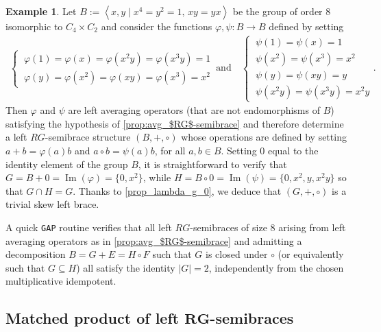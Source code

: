 \documentclass[11pt]{amsart}
\newcommand\Imm{\operatorname{Im}}
\theoremstyle{definition}
\newtheorem{Ex}[theorem]{Example}
\begin{document}
\begin{Ex}
    Let $B := \left\langle x,y \mid x^4 = y^2 = 1,\, xy = yx \right\rangle$ be the group of order $8$ isomorphic to $C_4 \times C_2$ and consider the functions $\varphi,\psi:B \to B$ defined by setting
    \begin{align*}
        \begin{cases}
        \ \varphi(1) = \varphi(x) = \varphi(x^2y) = \varphi(x^3y) = 1 \\[0.2cm]
        \ \varphi(y) = \varphi(x^2) = \varphi(xy) = \varphi(x^3) = x^2
        \end{cases}
        \,\text{and}\quad
        \begin{cases}
        \ \psi(1) = \psi(x) = 1 \\[0.05cm]
        \ \psi(x^2) = \psi(x^3) = x^2 \\[0.05cm]
        \ \psi(y) = \psi(xy) = y \\[0.05cm]
        \ \psi(x^2y) = \psi(x^3y) = x^2y 
        \end{cases}.
    \end{align*}
    Then $\varphi$ and $\psi$ are left averaging operators (that are not endomorphisms of $B$) satisfying the hypothesis of \cref{prop:avg_$RG$-semibrace} and therefore determine a left $RG$-semibrace structure $(B,+,\circ)$ whose operations are defined by setting $a + b = \varphi(a)b$ and $a \circ b = \psi(a)b$, for all $a,b \in B$.
    Setting $0$ equal to the identity element of the group $B$, it is straightforward to verify that $G = B + 0 = \Imm(\varphi) = \{0, x^2\}$, while $H = B \circ 0 = \Imm(\psi) = \{0,x^2,y,x^2y\}$ so that $G \cap H = G$.
    Thanks to \cref{prop_lambda_g_0}, we deduce that $(G,+,\circ)$ is a trivial skew left brace.
\end{Ex}

A quick \texttt{GAP} routine verifies that all left $RG$-semibraces of size $8$ arising from left averaging operators as in \cref{prop:avg_$RG$-semibrace} and admitting a decomposition $B = G + E = H \circ F$ such that $G$ is closed under $\circ$ (or equivalently such that $G \subseteq H$) all satisfy the identity $|G| = 2$, independently from the chosen multiplicative idempotent.

\medskip

\subsection{Matched product of left \texorpdfstring{$\mathbf{RG}$}-{-}semibraces}
\end{document}
